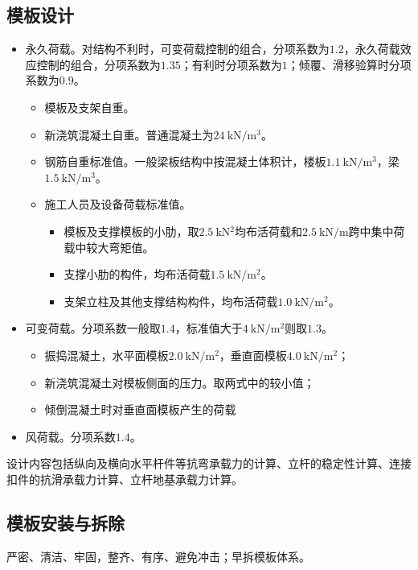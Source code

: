 \documentclass{book}
\begin{document}
\subsection{模板设计}
\begin{itemize}
    \item 永久荷载。对结构不利时，可变荷载控制的组合，分项系数为$1.2$，永久荷载效应控制的组合，分项系数为$1.35$；有利时分项系数为$1$；倾覆、滑移验算时分项系数为$0.9$。
          \begin{itemize}
              \item 模板及支架自重。
              \item 新浇筑混凝土自重。普通混凝土为$\SI{24}{\kN/\m^3}$。
              \item 钢筋自重标准值。一般梁板结构中按混凝土体积计，楼板$\SI{1.1}{\kN/\m^3}$，梁$\SI{1.5}{\kN/\m^3}$。
              \item 施工人员及设备荷载标准值。
                    \begin{itemize}
                        \item 模板及支撑模板的小肋，取$\SI{2.5}{\kN^2}$均布活荷载和$\SI{2.5}{\kN/\m}$跨中集中荷载中较大弯矩值。
                        \item 支撑小肋的构件，均布活荷载$\SI{1.5}{\kN/\m^2}$。
                        \item 支架立柱及其他支撑结构构件，均布活荷载$\SI{1.0}{\kN/\m^2}$。
                    \end{itemize}
          \end{itemize}
    \item 可变荷载。分项系数一般取$1.4$，标准值大于$\SI{4}{\kN/\m^2}$则取$1.3$。
          \begin{itemize}
              \item 振捣混凝土，水平面模板$\SI{2.0}{\kN/\m^2}$，垂直面模板$\SI{4.0}{\kN/\m^2}$；
              \item 新浇筑混凝土对模板侧面的压力。取两式中的较小值；
              \item 倾倒混凝土时对垂直面模板产生的荷载
          \end{itemize}
    \item 风荷载。分项系数$1.4$。
\end{itemize}
\par 设计内容包括纵向及横向水平杆件等抗弯承载力的计算、立杆的稳定性计算、连接扣件的抗滑承载力计算、立杆地基承载力计算。
\subsection{模板安装与拆除}
\par 严密、清洁、牢固，整齐、有序、避免冲击；早拆模板体系。
\end{document}
